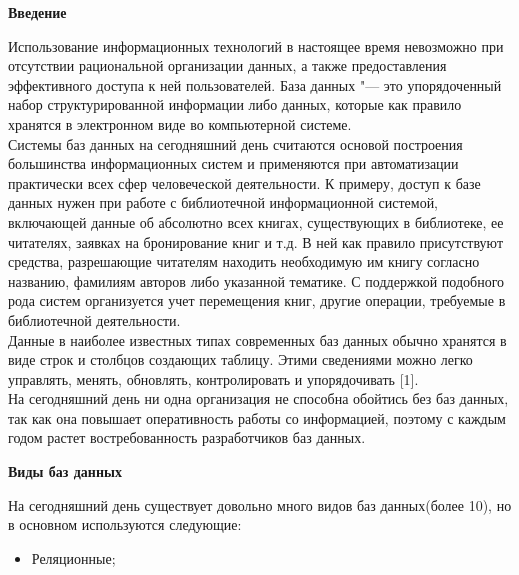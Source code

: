 \begin{flushleft}
    \setlength{\parindent}{14pt}
    \hspace*{10pt}
    \begin{center}
        \textbf{Введение}
    \end{center}
    \vspace*{14pt}

    Использование информационных технологий в настоящее время невозможно при отсутствии рациональной
организации данных, а также предоставления эффективного доступа к ней пользователей.
База данных "--- это упорядоченный набор структурированной информации либо данных,
которые как правило хранятся в электронном виде во компьютерной системе. \\

Системы баз данных на сегодняшний день считаются основой построения большинства информационных
систем и применяются при автоматизации практически всех сфер человеческой деятельности.
К примеру, доступ к базе данных нужен при работе с библиотечной информационной
системой, включающей данные об абсолютно всех книгах, существующих в библиотеке, ее читателях,
заявках на бронирование книг и т.д. В ней как правило присутствуют средства, разрешающие
читателям находить необходимую им книгу согласно названию, фамилиям авторов либо указанной
тематике. С поддержкой подобного рода систем организуется учет перемещения книг, другие операции,
требуемые в библиотечной деятельности.\\

Данные в наиболее известных типах современных баз данных обычно
хранятся в виде строк и столбцов создающих таблицу. Этими сведениями можно
легко управлять, менять, обновлять, контролировать и упорядочивать [1].\\
На сегодняшний день ни одна организация не способна обойтись без баз данных, так
как она повышает оперативность работы со информацией, поэтому с каждым годом растет востребованность 
разработчиков баз данных.
    
    \newpage
    \begin{center}
        \textbf{Виды баз данных}
    \end{center}
    \vspace*{14pt}

    На сегодняшний день существует довольно много видов баз данных(более 10),
    но в основном используются следующие:
    \begin{itemize}
        \item Реляционные;


\end{itemize}
\end{flushleft}
